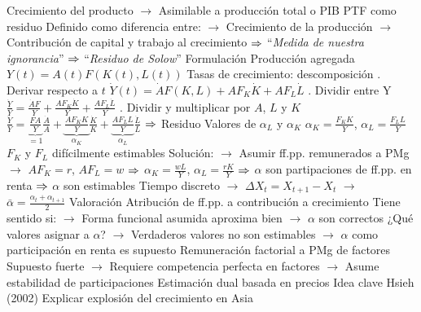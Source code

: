 \documentclass{nuevotema}
\begin{document}
\begin{esquemal}
				\4[] Crecimiento del producto
				\4[] $\to$ Asimilable a producción total o PIB
				\4 PTF como residuo
				\4[] Definido como diferencia entre:
				\4[] $\to$ Crecimiento de la producción
				\4[] $\to$ Contribución de capital y trabajo al crecimiento
				\4[] $\Rightarrow$ ``\textit{Medida de nuestra ignorancia}''
				\4[] $\Rightarrow$ ``\textit{Residuo de Solow}''
			\3 Formulación
				\4 Producción agregada
				\4[] $Y(t) = A(t) F(K(t), L(t))$
				\4 Tasas de crecimiento: descomposición
				. Derivar respecto a $t$
				\4[] $\dot{Y}(t) = \dot{A} F(K,L) + A F_K \dot{K} + A F_L \dot{L}$
				. Dividir entre Y
				\4[] $\frac{\dot{Y}}{Y} =  \frac{\dot{A} F}{Y} + \frac{A F_K \dot{K}}{Y} + \frac{A F_L \dot{L}}{Y} $
				. Dividir y multiplicar por $A$, $L$ y $K$
				\4[] $\frac{\dot{Y}}{Y} = \underbrace{\frac{F A}{Y}}_{=1} \frac{\dot{A}}{A} + \underbrace{\frac{A F_K K}{Y}}_{\alpha_K} \frac{\dot{K}}{K} + \underbrace{\frac{A F_L L}{Y}}_{\alpha_L} \frac{\dot{L}}{L}$
				\4[] $\Rightarrow$ 
				\4 Residuo
				\4[] 
				\4 Valores de $\alpha_L$ y $\alpha_K$
				\4[] $\alpha_K =\frac{F_K K}{Y}$, $\alpha_L = \frac{F_L L}{Y}$
				\4[] $F_K$ y $F_L$ difícilmente estimables
				\4[] Solución:
				\4[] $\to$ Asumir ff.pp. remunerados a PMg
				\4[] $\to$ $A F_K = r$, $A F_L = w$
				\4[] $\Rightarrow$ $\alpha_K = \frac{w L}{Y}$, $\alpha_L = \frac{rK}{Y}$
				\4[] $\Rightarrow$ $\alpha$ son partipaciones de ff.pp. en renta
				\4[] $\Rightarrow$ $\alpha$ son estimables
				\4 Tiempo discreto
				\4[] 
				\4[] $\to$ $\Delta X_t = X_{t+1} - X_t$
				\4[] $\to$ $\bar{\alpha} = \frac{\alpha_t + \alpha_{t+1}}{2}$
			\3 Valoración
				\4 Atribución de ff.pp. a contribución a crecimiento
				\4[] Tiene sentido si:
				\4[] $\to$ Forma funcional asumida aproxima bien
				\4[] $\to$ $\alpha$ son correctos
				\4[] ¿Qué valores asignar a $\alpha$?
				\4[] $\to$ Verdaderos valores no son estimables
				\4[] $\to$ $\alpha$ como participación en renta es supuesto
				\4 Remuneración factorial a PMg de factores
				\4[] Supuesto fuerte
				\4[] $\to$ Requiere competencia perfecta en factores
				\4[] $\to$ Asume estabilidad de participaciones
		\2 Estimación dual basada en precios
			\3 Idea clave
				\4 Hsieh (2002)
				\4[] Explicar explosión del crecimiento en Asia

\end{esquemal}
\end{document}
